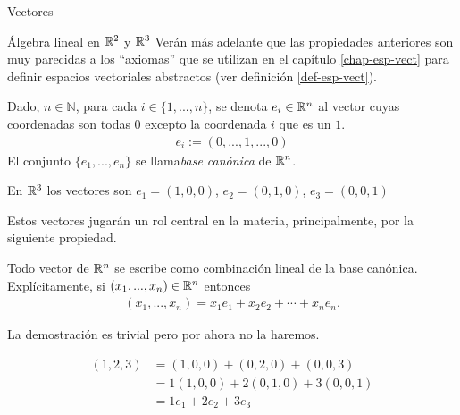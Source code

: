 \begin{chapter}{Vectores}
\begin{section}{\'Algebra lineal en $\mathbb R^2$ y $\mathbb R^3$}
Verán más adelante que las propiedades anteriores son muy parecidas a los  ``axiomas'' que se utilizan en el  capítulo \ref{chap-esp-vect} para definir espacios vectoriales abstractos (ver definición \ref{def-esp-vect}). 



    \begin{definicion}\label{def-base-canonica-rn}
    Dado, $n \in \mathbb N$, para cada $i\in\{1, ..., n\}$, se denota ${e_i}\in\mathbb R^n$ al vector cuyas coordenadas son todas $0$ excepto la coordenada $i$ que es un $1$.
    \begin{align*}
    e_i:=(0, ..., 1, ..., 0)
    \end{align*}
    El conjunto $\{e_1, ..., e_n\}$ se llama\textit{ {base canónica}} de $\mathbb R^n$.
\end{definicion}

\begin{ejemplo*}
    En $\mathbb R^3$ los vectores son $
    e_1=(1,0,0)$, $
    e_2=(0,1,0)$, 
    $e_3=(0,0,1)
    $
\end{ejemplo*}

Estos vectores jugarán un rol central en la materia, principalmente, por la siguiente propiedad.


\begin{proposicion}
    Todo vector de $\mathbb R^n$ se escribe como combinación lineal de la base canónica. Explícitamente, si $(x_1, ..., x_n)\in\mathbb R^n$ entonces
    \begin{align*}
    (x_1, ..., x_n)=x_1e_1+x_2e_2+\cdots+x_ne_n.
    \end{align*}
\end{proposicion}


La demostración es trivial pero por ahora no la haremos. 


\begin{ejemplo*}
    
    \begin{align*}
    (1,2,3)&=(1,0,0)+(0,2,0)+(0,0,3)\\
    &=1(1,0,0)+2(0,1,0)+3(0,0,1)\\
    &=1e_1+2e_2+3e_3
    \end{align*}
    
\end{ejemplo*}





\end{section}
\end{chapter}
